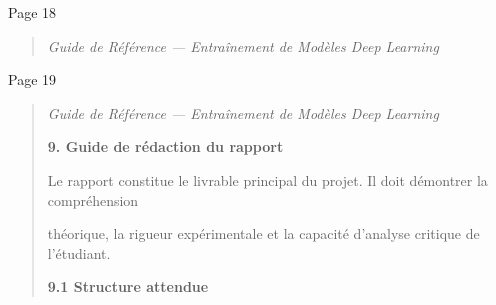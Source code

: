 \documentclass[
]{article}
\begin{document}
Page 18

\begin{quote}
\emph{Guide de Référence --- Entraînement de Modèles Deep Learning}
\end{quote}

Page 19

\begin{quote}
\emph{Guide de Référence --- Entraînement de Modèles Deep Learning}

\textbf{9. Guide de rédaction du rapport}

Le rapport constitue le livrable principal du projet. Il doit démontrer
la compréhension

théorique, la rigueur expérimentale et la capacité d'analyse critique de
l'étudiant.

\textbf{9.1 Structure attendue}
\end{quote}
\end{document}
